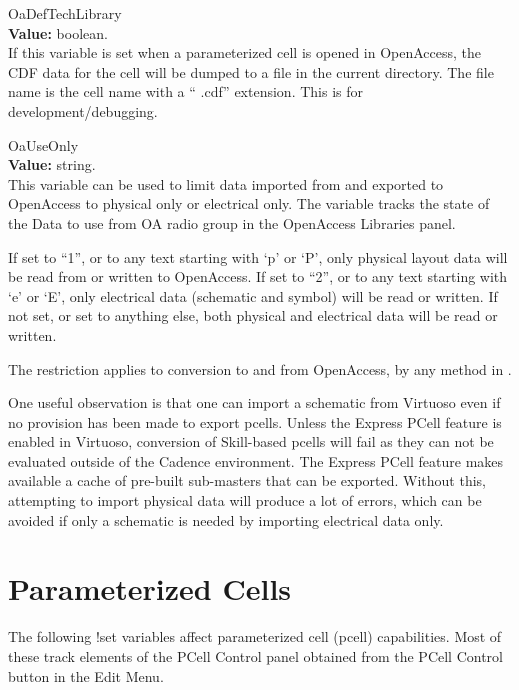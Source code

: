 \begin{description}
\item{\et OaDefTechLibrary}\\
{\bf Value:} boolean.\\
If this variable is set when a parameterized cell is opened in
OpenAccess, the CDF data for the cell will be dumped to a file in the
current directory.  The file name is the cell name with a ``{\vt
.cdf}'' extension.  This is for development/debugging.

\item{\et OaUseOnly}\\
{\bf Value:} string.\\
This variable can be used to limit data imported from and exported to
OpenAccess to physical only or electrical only.  The variable tracks
the state of the {\cb Data to use from OA} radio group in the {\cb
OpenAccess Libraries} panel. 

If set to ``1'', or to any text starting with `p' or `P', only
physical layout data will be read from or written to OpenAccess.  If
set to ``2'', or to any text starting with `e' or `E', only electrical
data (schematic and symbol) will be read or written.  If not set, or
set to anything else, both physical and electrical data will be read
or written.

The restriction applies to conversion to and from OpenAccess, by any
method in {\Xic}.

One useful observation is that one can import a schematic from
Virtuoso even if no provision has been made to export pcells.  Unless
the Express PCell feature is enabled in Virtuoso, conversion of
Skill-based pcells will fail as they can not be evaluated outside of
the Cadence environment.  The Express PCell feature makes available a
cache of pre-built sub-masters that can be exported.  Without this,
attempting to import physical data will produce a lot of errors, which
can be avoided if only a schematic is needed by importing electrical
data only.
\end{description}

\section{Parameterized Cells}

The following {\cb !set} variables affect parameterized cell (pcell)
capabilities.  Most of these track elements of the {\cb PCell Control}
panel obtained from the {\cb PCell Control} button in the {\cb Edit
Menu}.

